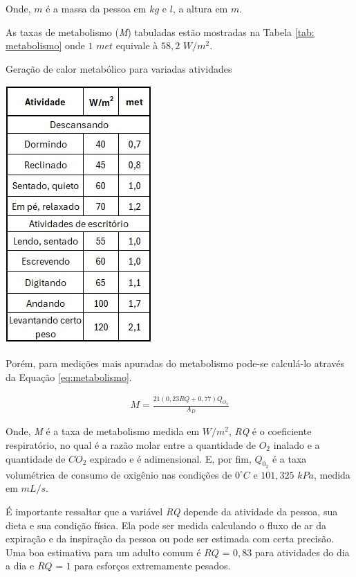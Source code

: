 \documentclass[acronym,symbols,table]{fei}
\begin{document}
Onde, $m$ é a massa da pessoa em $kg$ e $l$, a altura em $m$. 

As taxas de metabolismo (\textit{M}) tabuladas estão mostradas na Tabela \ref{tab: metabolismo} onde $1$ $met$ equivale à $58,2$ $W/m^2$.

\begin{table}[!htb] 
 \centering
    \caption{Geração de calor metabólico para variadas atividades}
    \includegraphics[width=0.4\linewidth]{Tabelas/tabela-met1.jpeg}
    \label{tab: metabolismo}
\end{table}

Porém, para medições mais apuradas do metabolismo pode-se calculá-lo através da Equação \ref{eq:metabolismo}.

\begin{equation} \label{eq:metabolismo}
    \begin{aligned}
   M = \frac{21(0,23RQ + 0,77)Q_{{O_{2}}}}{A_{D}}
    \end{aligned}
\end{equation}

Onde, \textit{M} é a taxa de metabolismo medida em $W/m^2$, \textit{RQ} é o coeficiente respiratório, no qual é a razão molar entre a quantidade de ${O}_{2}$ inalado e a quantidade de ${CO}_{2}$ expirado e é adimensional. E, por fim, $Q_{0_{2}}$ é a taxa volumétrica de consumo de oxigênio nas condições de $0^\circ C$ e $101,325$ $kPa$, medida em $mL/s$.

É importante ressaltar que a variável \textit{RQ} depende da atividade da pessoa, sua dieta e sua condição física. Ela pode ser medida calculando o fluxo de ar da expiração e da inspiração da pessoa ou pode ser estimada com certa precisão. Uma boa estimativa para um adulto comum é $RQ$ = $0,83$ para atividades do dia a dia e $RQ$ = $1$ para esforços extremamente pesados.
\end{document}
